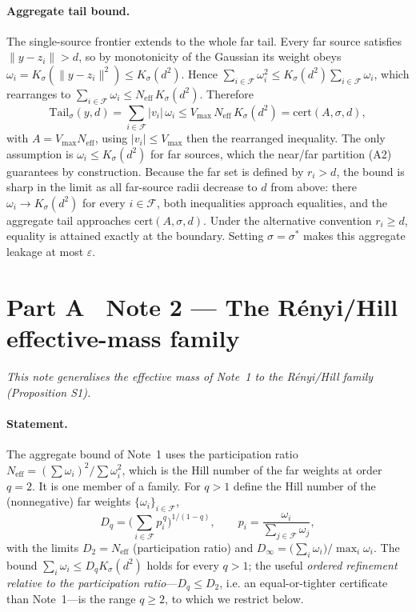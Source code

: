 \documentclass[10pt,twocolumn]{article}
\newcommand{\Ksig}{K_{\sigma}}
\newcommand{\sstar}{\sigma^{*}}
\newcommand{\Neff}{N_{\mathrm{eff}}}
\begin{document}
\paragraph{Aggregate tail bound.} The single-source frontier extends to the whole far tail. Every far source satisfies $\lVert y-z_i\rVert>d$, so by monotonicity of the Gaussian its weight obeys $\omega_i=\Ksig(\lVert y-z_i\rVert^2)\le\Ksig(d^2)$. Hence $\sum_{i\in\mathcal{F}}\omega_i^2\le\Ksig(d^2)\sum_{i\in\mathcal{F}}\omega_i$, which rearranges to $\sum_{i\in\mathcal{F}}\omega_i\le\Neff\,\Ksig(d^2)$. Therefore
\begin{equation}
\mathrm{Tail}_\sigma(y,d)=\sum_{i\in\mathcal{F}}|v_i|\,\omega_i\le V_{\max}\,\Neff\,\Ksig(d^2)=\mathrm{cert}(A,\sigma,d),
\end{equation}
with $A=V_{\max}\Neff$, using $|v_i|\le V_{\max}$ then the rearranged inequality. The only assumption is $\omega_i\le\Ksig(d^2)$ for far sources, which the near/far partition (A2) guarantees by construction. Because the far set is defined by $r_i>d$, the bound is sharp in the limit as all far-source radii decrease to $d$ from above: there $\omega_i\to\Ksig(d^2)$ for every $i\in\mathcal{F}$, both inequalities approach equalities, and the aggregate tail approaches $\mathrm{cert}(A,\sigma,d)$. Under the alternative convention $r_i\ge d$, equality is attained exactly at the boundary. Setting $\sigma=\sstar$ makes this aggregate leakage at most $\varepsilon$.

\section*{Part A \textperiodcentered\ Note 2 --- The R\'enyi/Hill effective-mass family}
\label{si:renyi}
\emph{This note generalises the effective mass of Note~1 to the R\'enyi/Hill family (Proposition S1).}
\paragraph{Statement.} The aggregate bound of Note~1 uses the participation ratio $\Neff=(\sum\omega_i)^2/\sum\omega_i^2$, which is the Hill number of the far weights at order $q=2$. It is one member of a family. For $q>1$ define the Hill number of the (nonnegative) far weights $\{\omega_i\}_{i\in\mathcal{F}}$,
\begin{equation}
D_q=\Big(\sum_{i\in\mathcal{F}}p_i^{\,q}\Big)^{1/(1-q)},\qquad p_i=\frac{\omega_i}{\sum_{j\in\mathcal{F}}\omega_j},
\end{equation}
with the limits $D_2=\Neff$ (participation ratio) and $D_\infty=\big(\sum_i\omega_i\big)/\max_i\omega_i$. The bound $\sum_i\omega_i\le D_q K_\sigma(d^2)$ holds for every $q>1$; the useful \emph{ordered refinement relative to the participation ratio}---$D_q\le D_2$, i.e. an equal-or-tighter certificate than Note~1---is the range $q\ge2$, to which we restrict below.
\end{document}
